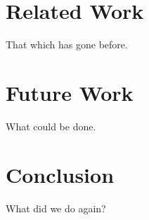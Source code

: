 \documentclass[]{article}
\begin{document}
\section{Related Work}
\label{sec:related}
That which has gone before.

\section{Future Work}
\label{sec:future}
What could be done.

\section{Conclusion}
\label{sec:conclusion}
What did we do again?



\end{document}
